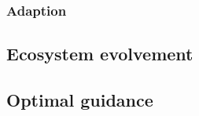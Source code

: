 \subsubsection{Adaption}

\subsection{Ecosystem evolvement} %
\label{sub:ecosystem_evolvement}


\subsection{Optimal guidance} %
\label{sub:optimal_guidance}

